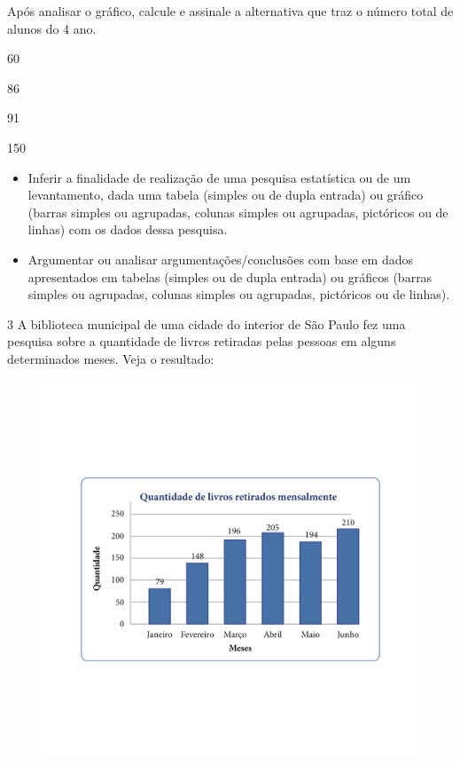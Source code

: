 Após analisar o gráfico, calcule e assinale a alternativa que traz o
número total de alunos do 4 ano.

\begin{escolha}
\item
  60
\item
  86
\item
  91
\item
  150
\end{escolha}



\begin{itemize}
\item Inferir a finalidade de realização de uma pesquisa estatística ou de
um levantamento, dada uma tabela (simples ou de dupla entrada) ou
gráfico (barras simples ou agrupadas, colunas simples ou agrupadas,
pictóricos ou de linhas) com os dados dessa pesquisa.

\item Argumentar ou analisar argumentações/conclusões com base em dados
apresentados em tabelas (simples ou de dupla entrada) ou gráficos
(barras simples ou agrupadas, colunas simples ou agrupadas, pictóricos
ou de linhas).
\end{itemize}


\num{3} A biblioteca municipal de uma cidade do interior de São Paulo fez
uma pesquisa sobre a quantidade de livros retiradas pelas pessoas em
alguns determinados meses. Veja o resultado:

\begin{figure}[htpb!]
\includegraphics[width=\textwidth]{../ilustracoes/MAT5/SAEB_5ANO_MAT_figura111.png}
\end{figure}

